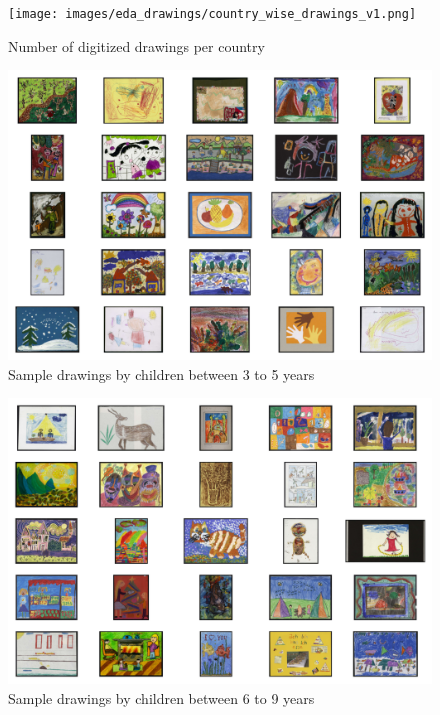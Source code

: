 \begin{figure}[ht]
\centering
\texttt{[image: images/eda\_drawings/country\_wise\_drawings\_v1.png]}
  \caption{Number of digitized drawings per country}
  \label{fig:drawing-per-country}
\end{figure}

\begin{figure}[ht]
\centering
\includegraphics[width=\textwidth]{images/sample_drawings/sample_drawings_3_5.png}
  \caption{Sample drawings by children between 3 to 5 years}
  \label{fig:drawing-3_5}
\end{figure}

\begin{figure}[ht]
\centering
\includegraphics[width=\textwidth]{images/sample_drawings/sample_drawings_6_9.png}
  \caption{Sample drawings by children between 6 to 9 years}
  \label{fig:drawing-6_9}
\end{figure}

